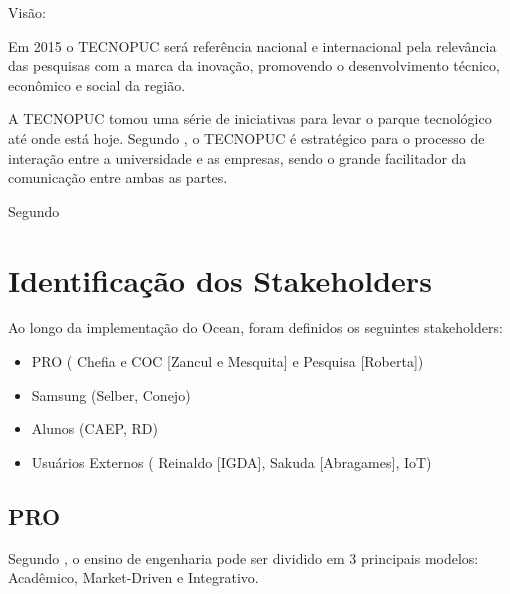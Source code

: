 Visão:

Em 2015 o TECNOPUC será referência nacional e internacional pela relevância das pesquisas com a marca da inovação, promovendo o desenvolvimento técnico, econômico e social da região.



A TECNOPUC tomou uma série de iniciativas para levar o parque tecnológico até onde está hoje. Segundo , o TECNOPUC é estratégico para o processo de interação entre a universidade e as empresas, sendo o grande facilitador da comunicação entre ambas as partes.

Segundo 

\section{Identificação dos Stakeholders}
\label{sec:identificacao_stakeholders}

Ao longo da implementação do Ocean, foram definidos os seguintes stakeholders:

\begin{itemize}
\item PRO ( Chefia e COC [Zancul e Mesquita] e Pesquisa [Roberta])
\item Samsung (Selber, Conejo)
\item Alunos (CAEP, RD)
\item Usuários Externos ( Reinaldo [IGDA], Sakuda [Abragames], IoT)
\end{itemize}

\subsection{PRO}
\label{sec:con_pro}

Segundo , o ensino de engenharia pode ser dividido em 3 principais modelos: Acadêmico, Market-Driven e Integrativo.

